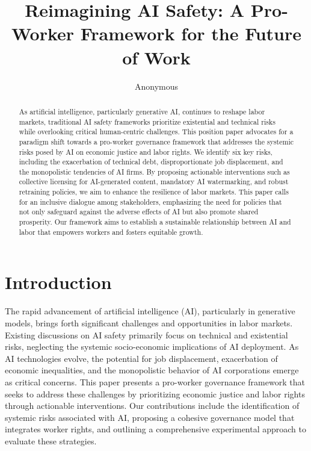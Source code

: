 \documentclass{article} %
\title{
Reimagining AI Safety: A Pro-Worker Framework for the Future of Work
}
\author{Anonymous}
\theoremstyle{plain}
\theoremstyle{definition}
\theoremstyle{remark}
\begin{document}
\maketitle

\begin{abstract}
As artificial intelligence, particularly generative AI, continues to reshape labor markets, traditional AI safety frameworks prioritize existential and technical risks while overlooking critical human-centric challenges. This position paper advocates for a paradigm shift towards a pro-worker governance framework that addresses the systemic risks posed by AI on economic justice and labor rights. We identify six key risks, including the exacerbation of technical debt, disproportionate job displacement, and the monopolistic tendencies of AI firms. By proposing actionable interventions such as collective licensing for AI-generated content, mandatory AI watermarking, and robust retraining policies, we aim to enhance the resilience of labor markets. This paper calls for an inclusive dialogue among stakeholders, emphasizing the need for policies that not only safeguard against the adverse effects of AI but also promote shared prosperity. Our framework aims to establish a sustainable relationship between AI and labor that empowers workers and fosters equitable growth.
\end{abstract}

\section{Introduction}
The rapid advancement of artificial intelligence (AI), particularly in generative models, brings forth significant challenges and opportunities in labor markets. Existing discussions on AI safety primarily focus on technical and existential risks, neglecting the systemic socio-economic implications of AI deployment. As AI technologies evolve, the potential for job displacement, exacerbation of economic inequalities, and the monopolistic behavior of AI corporations emerge as critical concerns. This paper presents a pro-worker governance framework that seeks to address these challenges by prioritizing economic justice and labor rights through actionable interventions. Our contributions include the identification of systemic risks associated with AI, proposing a cohesive governance model that integrates worker rights, and outlining a comprehensive experimental approach to evaluate these strategies.
\end{document}
